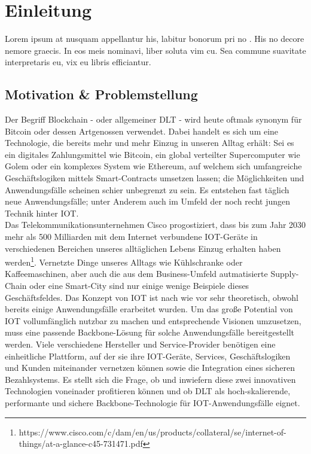 \chapter{Einleitung}
\label{ch:intro}
Lorem ipsum at nusquam appellantur his, labitur bonorum pri no \citep{dueck:trio}. His no decore nemore graecis. In eos meis nominavi, liber soluta vim cu. Sea commune suavitate interpretaris eu, vix eu libris efficiantur.

%
%
\section{Motivation \& Problemstellung}
\label{sec:intro:motivation}
Der Begriff Blockchain - oder allgemeiner \ac{DLT} - wird heute oftmals synonym für Bitcoin oder dessen Artgenossen verwendet. Dabei handelt es sich um eine Technologie, die bereits mehr und mehr Einzug in unseren Alltag erhält: Sei es ein digitales Zahlungsmittel wie Bitcoin, ein global verteilter Supercomputer wie Golem oder ein komplexes System wie Ethereum, auf welchem sich umfangreiche Geschäftslogiken mittels Smart-Contracts umsetzen lassen; die Möglichkeiten und Anwendungsfälle scheinen schier unbegrenzt zu sein. Es entstehen fast täglich neue Anwendungsfälle; unter Anderem auch im Umfeld der noch recht jungen Technik hinter \ac{IOT}.\\
Das Telekommunikationsunternehmen Cisco progostiziert, dass bis zum Jahr 2030 mehr als 500 Milliarden mit dem Internet verbundene IOT-Geräte in verschiedenen Bereichen unseres alltäglichen Lebens Einzug erhalten haben werden\footnote{https://www.cisco.com/c/dam/en/us/products/collateral/se/internet-of-things/at-a-glance-c45-731471.pdf}. Vernetzte Dinge unseres Alltags wie Kühlschranke oder Kaffeemaschinen, aber auch die aus dem Business-Umfeld autmatisierte Supply-Chain oder eine Smart-City sind nur einige wenige Beispiele dieses Geschäftsfeldes. Das Konzept von IOT ist nach wie vor sehr theoretisch, obwohl bereits einige Anwendungsfälle erarbeitet wurden. Um das große Potential von IOT vollumfänglich nutzbar zu machen und entsprechende Visionen umzusetzen, muss eine passende Backbone-Lösung für solche Anwendungsfälle bereitgestellt werden. Viele verschiedene Hersteller und Service-Provider benötigen eine einheitliche Plattform, auf der sie ihre IOT-Geräte, Services, Geschäftslogiken und Kunden miteinander vernetzen können sowie die Integration eines sicheren Bezahlsystems. Es stellt sich die Frage, ob und inwiefern diese zwei innovativen Technologien voneinader profitieren können und ob \ac{DLT} als hoch-skalierende, performante und sichere Backbone-Technologie für \ac{IOT}-Anwendungsfälle eignet.


